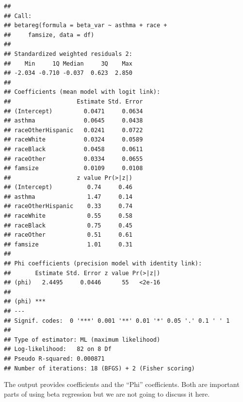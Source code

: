 \documentclass[]{tufte-book}
\newenvironment{Shaded}{}{}
\newcommand{\KeywordTok}[1]{\textcolor[rgb]{0.00,0.44,0.13}{\textbf{#1}}}
\newcommand{\DataTypeTok}[1]{\textcolor[rgb]{0.56,0.13,0.00}{#1}}
\newcommand{\FloatTok}[1]{\textcolor[rgb]{0.25,0.63,0.44}{#1}}
\newcommand{\StringTok}[1]{\textcolor[rgb]{0.25,0.44,0.63}{#1}}
\newcommand{\OtherTok}[1]{\textcolor[rgb]{0.00,0.44,0.13}{#1}}
\newcommand{\OperatorTok}[1]{\textcolor[rgb]{0.40,0.40,0.40}{#1}}
\newcommand{\NormalTok}[1]{#1}
\theoremstyle{definition}
\theoremstyle{definition}
\theoremstyle{remark}
\begin{document}
\begin{Shaded}
\end{Shaded}

\begin{verbatim}
## 
## Call:
## betareg(formula = beta_var ~ asthma + race + 
##     famsize, data = df)
## 
## Standardized weighted residuals 2:
##    Min     1Q Median     3Q    Max 
## -2.034 -0.710 -0.037  0.623  2.850 
## 
## Coefficients (mean model with logit link):
##                   Estimate Std. Error
## (Intercept)         0.0471     0.0634
## asthma              0.0645     0.0438
## raceOtherHispanic   0.0241     0.0722
## raceWhite           0.0324     0.0589
## raceBlack           0.0458     0.0611
## raceOther           0.0334     0.0655
## famsize             0.0109     0.0108
##                   z value Pr(>|z|)
## (Intercept)          0.74     0.46
## asthma               1.47     0.14
## raceOtherHispanic    0.33     0.74
## raceWhite            0.55     0.58
## raceBlack            0.75     0.45
## raceOther            0.51     0.61
## famsize              1.01     0.31
## 
## Phi coefficients (precision model with identity link):
##       Estimate Std. Error z value Pr(>|z|)
## (phi)   2.4495     0.0446      55   <2e-16
##          
## (phi) ***
## ---
## Signif. codes:  0 '***' 0.001 '**' 0.01 '*' 0.05 '.' 0.1 ' ' 1 
## 
## Type of estimator: ML (maximum likelihood)
## Log-likelihood:   82 on 8 Df
## Pseudo R-squared: 0.000871
## Number of iterations: 18 (BFGS) + 2 (Fisher scoring)
\end{verbatim}

The output provides coefficients and the ``Phi'' coefficients. Both are
important parts of using beta regression but we are not going to discuss
it here.
\end{document}
